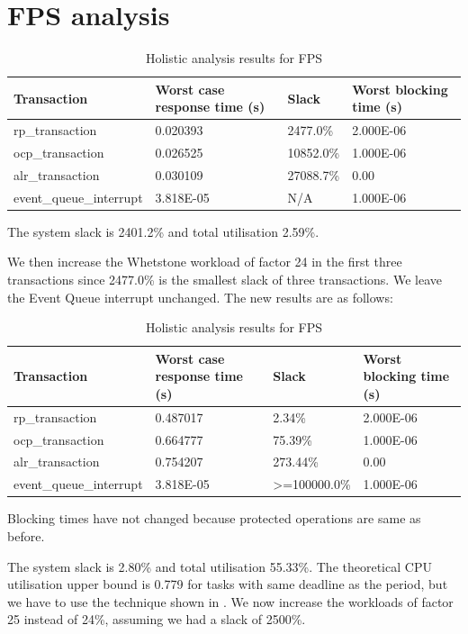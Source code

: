 \documentclass{article}
\begin{document}
\section{FPS analysis}

\begin{table}[!htbp]
  \centering
  \begin{tabular}{llll}
    \toprule
    Transaction & Worst case response time (s) & Slack & Worst blocking time (s)  \\
    \midrule
    rp\_transaction & 0.020393  & 2477.0\% &  2.000E-06  \\
    ocp\_transaction & 0.026525 & 10852.0\% & 1.000E-06 \\
    alr\_transaction & 0.030109 & 27088.7\% & 0.00 \\
    event\_queue\_interrupt & 3.818E-05 & N/A & 1.000E-06 \\
    \bottomrule
  \end{tabular}
  \caption{Holistic analysis results for FPS}
  \label{tab:holistic-fps}
\end{table}

The system slack is 2401.2\% and total utilisation 2.59\%.

We then increase the Whetstone workload of factor 24 in the first three transactions since 2477.0\% is the smallest slack of three transactions. We leave the Event Queue interrupt unchanged. The new results are as follows:

\begin{table}[!htbp]
   \centering
   \begin{tabular}{llll}
     \toprule
     Transaction & Worst case response time (s) & Slack & Worst blocking time (s)  \\
     \midrule
     rp\_transaction & 0.487017  & 2.34\% &  2.000E-06  \\
     ocp\_transaction & 0.664777 & 75.39\% & 1.000E-06 \\
     alr\_transaction & 0.754207 & 273.44\% & 0.00 \\
     event\_queue\_interrupt & 3.818E-05 & >=100000.0\% & 1.000E-06 \\
     \bottomrule
   \end{tabular}
   \caption{Holistic analysis results for FPS}
   \label{tab:holistic-fps}
\end{table}

Blocking times have not changed because protected operations are same as before.

The system slack is 2.80\% and total utilisation 55.33\%. The theoretical CPU utilisation upper bound \cite{liu-utilisation-bound} is 0.779 for tasks with same deadline as the period, but we have to use the technique shown in \cite{practitioner-utilisation-bound}. We now increase the workloads of factor 25 instead of 24\%, assuming we had a slack of 2500\%.
\end{document}

